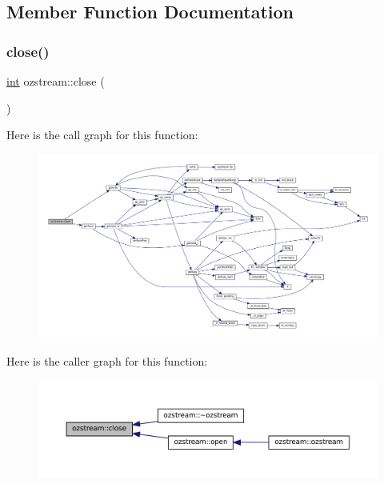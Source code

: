 \subsection{Member Function Documentation}
\mbox{\label{classozstream_a1f5bf09289fa67b17e768435cf4f01f1}} 
\subsubsection{\texorpdfstring{close()}{close()}}
{\footnotesize\ttfamily \mbox{\hyperlink{ioapi_8h_a787fa3cf048117ba7123753c1e74fcd6}{int}} ozstream\+::close (\begin{DoxyParamCaption}{ }\end{DoxyParamCaption})\hspace{0.3cm}{\ttfamily [inline]}}

Here is the call graph for this function\+:
\nopagebreak
\begin{figure}[H]
\begin{center}
\leavevmode
\includegraphics[width=350pt]{classozstream_a1f5bf09289fa67b17e768435cf4f01f1_cgraph}
\end{center}
\end{figure}
Here is the caller graph for this function\+:
\nopagebreak
\begin{figure}[H]
\begin{center}
\leavevmode
\includegraphics[width=350pt]{classozstream_a1f5bf09289fa67b17e768435cf4f01f1_icgraph}
\end{center}
\end{figure}
\mbox{\label{classozstream_a189c85676e712ba4776bb17e1de22388}} 
